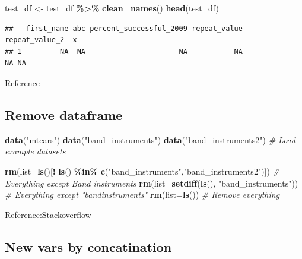 \documentclass[
]{article}
\newenvironment{Shaded}{\begin{snugshade}}{\end{snugshade}}
\newcommand{\AttributeTok}[1]{\textcolor[rgb]{0.13,0.29,0.53}{#1}}
\newcommand{\CommentTok}[1]{\textcolor[rgb]{0.56,0.35,0.01}{\textit{#1}}}
\newcommand{\FunctionTok}[1]{\textcolor[rgb]{0.13,0.29,0.53}{\textbf{#1}}}
\newcommand{\NormalTok}[1]{#1}
\newcommand{\OtherTok}[1]{\textcolor[rgb]{0.56,0.35,0.01}{#1}}
\newcommand{\SpecialCharTok}[1]{\textcolor[rgb]{0.81,0.36,0.00}{\textbf{#1}}}
\newcommand{\StringTok}[1]{\textcolor[rgb]{0.31,0.60,0.02}{#1}}
\begin{document}
\begin{Shaded}
\begin{Highlighting}[]
\NormalTok{test\_df }\OtherTok{\textless{}{-}}\NormalTok{ test\_df }\SpecialCharTok{\%\textgreater{}\%}
  \FunctionTok{clean\_names}\NormalTok{()}
\FunctionTok{head}\NormalTok{(test\_df)}
\end{Highlighting}
\end{Shaded}

\begin{verbatim}
##   first_name abc percent_successful_2009 repeat_value repeat_value_2  x
## 1         NA  NA                      NA           NA             NA NA
\end{verbatim}

\href{https://cran.r-project.org/web/packages/janitor/vignettes/janitor.html}{Reference}

\hypertarget{remove-dataframe}{%
\subsection{Remove dataframe}\label{remove-dataframe}}

\begin{Shaded}
\begin{Highlighting}[]
\FunctionTok{data}\NormalTok{(}\StringTok{"mtcars"}\NormalTok{)}
\FunctionTok{data}\NormalTok{(}\StringTok{"band\_instruments"}\NormalTok{)}
\FunctionTok{data}\NormalTok{(}\StringTok{"band\_instruments2"}\NormalTok{) }\CommentTok{\# Load example datasets}

\FunctionTok{rm}\NormalTok{(}\AttributeTok{list=}\FunctionTok{ls}\NormalTok{()[}\SpecialCharTok{!} \FunctionTok{ls}\NormalTok{() }\SpecialCharTok{\%in\%} \FunctionTok{c}\NormalTok{(}\StringTok{"band\_instruments"}\NormalTok{,}\StringTok{"band\_instruments2"}\NormalTok{)]) }
\CommentTok{\# Everything except Band instruments}
\FunctionTok{rm}\NormalTok{(}\AttributeTok{list=}\FunctionTok{setdiff}\NormalTok{(}\FunctionTok{ls}\NormalTok{(), }\StringTok{"band\_instruments"}\NormalTok{)) }\CommentTok{\# Everything except "bandinstruments"}
\FunctionTok{rm}\NormalTok{(}\AttributeTok{list=}\FunctionTok{ls}\NormalTok{()) }\CommentTok{\# Remove everything}
\end{Highlighting}
\end{Shaded}

\href{https://stackoverflow.com/questions/6190051/how-can-i-remove-all-objects-but-one-from-the-workspace-in-r}{Reference:Stackoverflow}

\hypertarget{new-vars-by-concatination}{%
\subsection{New vars by concatination}\label{new-vars-by-concatination}}
\end{document}
